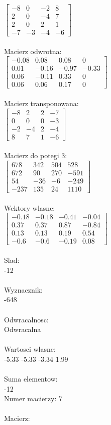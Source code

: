 \documentclass[a4paper,12pt]{article}
\begin{document}
$\begin{bmatrix} -8&0&-2&8\\2&0&-4&7\\2&0&2&1\\-7&-3&-4&-6 \end{bmatrix}$
\\
\\
Macierz odwrotna:\\

$\begin{bmatrix} -0.08&0.08&0.08&0\\0.01&-0.16&-0.97&-0.33\\0.06&-0.11&0.33&0\\0.06&0.06&0.17&0 \end{bmatrix}$
\\
\\
Macierz transponowana:\\

$\begin{bmatrix} -8&2&2&-7\\0&0&0&-3\\-2&-4&2&-4\\8&7&1&-6 \end{bmatrix}$
\\
\\
Macierz do potegi 3:\\

$\begin{bmatrix} 678&342&504&528\\672&90&270&-591\\54&-36&-6&-249\\-237&135&24&1110 \end{bmatrix}$
\\
\\
Wektory wlasne:\\

$\begin{bmatrix} -0.18&-0.18&-0.41&-0.04\\0.37&0.37&0.87&-0.84\\0.13&0.13&0.19&0.54\\-0.6&-0.6&-0.19&0.08 \end{bmatrix}$
\\
\\
Slad:\\
-12
\\
\\
Wyznacznik:\\
-648
\\
\\
Odwracalnosc:\\
Odwracalna
\\
\\
Wartosci wlasne:\\
-5.33 -5.33 -3.34 1.99
\\
\\
Suma elementow:\\
-12
\\
\newpage
Numer macierzy:
7
\\
\\
Macierz:\\
\end{document}
